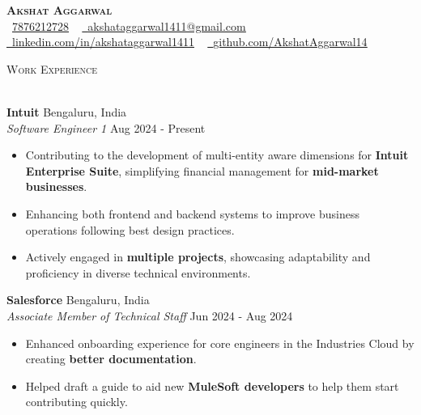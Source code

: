 \documentclass[a4paper]{article}
\newcommand{\bulletSep} { \vspace{2.5mm} }
\newcommand{\lineunder} {
    \vspace*{-8pt} \\
    \hspace*{-15pt} \hrulefill \\
}
\newcommand{\header} [1] {
    {\hspace*{-18pt}\vspace*{6pt} {
        \fontfamily{qcs}\selectfont \large \scshape #1
    }}
    \vspace*{-6pt} \lineunder
    \vspace{1.1mm}
}
\newcommand{\experienceItem}[5]{
    \textbf{#1} \hfill #2 \\
    \textit{#3} \hfill #4 \\
    #5
}
\newcommand{\link}[2]{
    \href{#1}{\textbf{#2}}
}
\begin{document}

\begin{center}
    {\textbf{\Huge \scshape Akshat Aggarwal}} \\ \vspace{4pt}
    \small \textcolor{black}{\faPhone\
        \href{tel:+917876212728}{7876212728}} ~ \href{mailto:akshataggarwal1411@gmail.com}{{\raisebox{-0.2\height}\faEnvelope\  \underline{akshataggarwal1411@gmail.com}}} ~
    \href{https://www.linkedin.com/in/akshataggarwal1411/}{{\raisebox{-0.2\height}\faLinkedinSquare\ \underline{linkedin.com/in/akshataggarwal1411}}}  ~
    \href{https://github.com/AkshatAggarwal14}{{\raisebox{-0.2\height}\faGithub\ \underline{github.com/AkshatAggarwal14}}}
\end{center}


\hypersetup {
    urlcolor     = blue, %
}


\header{Work Experience}

\experienceItem{Intuit}{Bengaluru, India}{Software Engineer 1}{Aug 2024 - Present}{
    \begin{itemize}
        \item Contributing to the development of multi-entity aware dimensions for \textbf{Intuit Enterprise Suite}, simplifying financial management for \textbf{mid-market businesses}.
        \item Enhancing both frontend and backend systems to improve business operations following best design practices.
        \item Actively engaged in \textbf{multiple projects}, showcasing adaptability and proficiency in diverse technical environments.
    \end{itemize}
}
\bulletSep

\experienceItem{Salesforce}{Bengaluru, India}{Associate Member of Technical Staff}{Jun 2024 - Aug 2024}{
    \begin{itemize}
        \item Enhanced onboarding experience for core engineers in the Industries Cloud by creating \textbf{better documentation}.
        \item Helped draft a guide to aid new \textbf{MuleSoft developers} to help them start contributing quickly.
    \end{itemize}
}
\bulletSep
\end{document}
